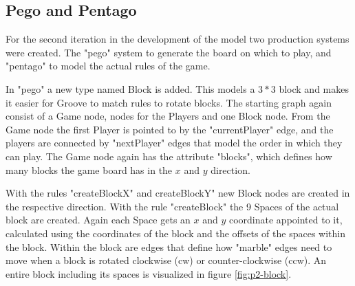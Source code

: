 \subsection{Pego and Pentago}
\label{pego_and_pentago}

For the second iteration in the development of the model two production systems were created. The "pego" system to generate the board on which to play, and "pentago" to model the actual rules of the game.

\vspace{6pt}

In "pego" a new type named Block is added. This models a $3*3$ block and makes it easier for Groove to match rules to rotate blocks.
The starting graph again consist of a Game node, nodes for the Players and one Block node. From the Game node the first Player is pointed to by the "currentPlayer" edge, and the players are connected by "nextPlayer" edges that model the order in which they can play.
The Game node again has the attribute "blocks", which defines how many blocks the game board has in the $x$ and $y$ direction.

\vspace{6pt}

With the rules "createBlockX" and createBlockY" new Block nodes are created in the respective direction.
With the rule "createBlock" the 9 Spaces of the actual block are created. Again each Space gets an $x$ and $y$ coordinate appointed to it, calculated using the coordinates of the block and the offsets of the spaces within the block.
Within the block are edges that define how "marble" edges need to move when a block is rotated clockwise (cw) or counter-clockwise (ccw).
An entire block including its spaces is visualized in figure  \ref{fig:p2-block}.

